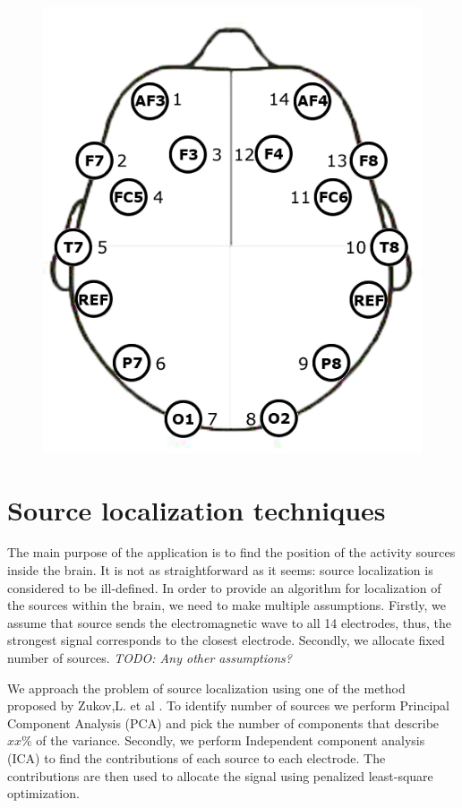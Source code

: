 \documentclass[]{article}   %
\begin{document}
\begin{figure}[!h]
\begin{center}
\includegraphics[width=0.5\columnwidth]{../Images/epoc_placement} 
\caption{}
\label{fig:epoc_placement}
\end{center}
\end{figure}
 
\section{Source localization techniques}
The main purpose of the application is to find the position of the activity sources inside the brain. It is not as straightforward as it seems: source localization is considered to be ill-defined. In order to provide an algorithm for localization of the sources within the brain, we need to make multiple assumptions. Firstly, we assume that source sends the electromagnetic wave to all 14 electrodes, thus, the strongest signal corresponds to the closest electrode. Secondly, we allocate fixed number of sources. \emph{TODO: Any other assumptions?}

We approach the problem of source localization using one of the method proposed by Zukov,L. et al \cite{zhukov2000}. To identify number of sources we perform Principal Component Analysis (PCA) and pick the number of components that describe $xx\%$ of the variance. Secondly, we perform Independent component analysis (ICA) to find the contributions of each source to each electrode. The contributions are then used to allocate the signal using penalized least-square optimization.
\end{document}
